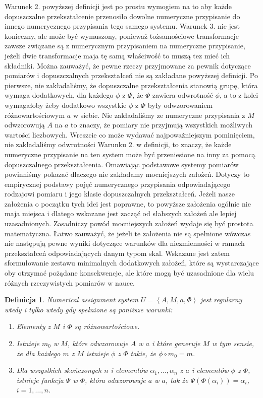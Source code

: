 \documentclass[12pt,a4paper]{report}
\newtheorem{definition}{Definicja}
\newcommand{\tuple}[1]{\left\langle {#1} \right\rangle}
\begin{document}
Warunek 2. powyższej definicji jest po prostu wymogiem na to aby każde dopuszczalne przekształcenie  przenosiło dowolne numeryczne przypisanie do innego numerycznego przypisania tego samego systemu. Warunek 3. nie jest konieczny, ale może być wymuszony, ponieważ tożsamościowe transformacje zawsze związane są z numerycznym przypisaniem na numeryczne przypisanie, jeżeli dwie transformacje maja tę samą właściwość to muszą tez mieć ich składniki. Można zauważyć, że pewne rzeczy przyjmowane za pewnik dotyczące pomiarów i dopuszczalnych przekształceń nie są zakładane  powyższej definicji. Po pierwsze, nie zakładaliśmy, że dopuszczalne przekształcenia stanowią grupę, która wymaga dodatkowych, dla każdego $\phi$ z $\Phi$, że $\Phi$ zawiera odwrotność $\phi$, a to z kolei wymagałoby żeby dodatkowo wszystkie $\phi$ z $\Phi$ były odwzorowaniem różnowartościowym $a$ w siebie. Nie zakładaliśmy ze numeryczne przypisania z $M$ odwzorowują $A$ na $a$ to znaczy, że pomiary nie przyjmują wszystkich  możliwych wartości liczbowych. Wreszcie co może wydawać najpoważniejszym pominięciem, nie zakładaliśmy odwrotności Warunku 2. w definicji, to znaczy, że każde numeryczne przypisanie na ten system może być przeniesione na inny za pomocą dopuszczalnego przekształcenia. Omawiając podstawowe systemy pomiarów powinniśmy pokazać dlaczego nie zakładamy mocniejszych założeń. Dotyczy to empirycznej podstawy pojęć numerycznego przypisania odpowiadającego rodzajowi pomiaru i jego klasie dopuszczalnych przekształceń. Jeżeli nasze założenia o początku tych idei jest poprawne, to powyższe założenia ogólnie nie maja miejsca i dlatego wskazane jest zacząć od słabszych założeń ale lepiej uzasadnionych. Zasadniczy powód mocniejszych założeń wydaje się być prostota matematyczna. Łatwo zauważyć, że jeżeli te założenia nie są spełnione 
wówczas nie następują pewne wyniki dotyczące warunków dla niezmienności w ramach przekształceń odpowiadających danym typom skal. Wskazane jest zatem sformułowanie zestawu minimalnych dodatkowych założeń, które są wystarczające oby otrzymać pożądane konsekwencje, ale które mogą być uzasadnione dla wielu różnych rzeczywistych pomiarów w nauce.
\begin{definition}
Numerical assignment system $U=\tuple{A, M, a, \Phi}$ jest regularny wtedy i tylko wtedy gdy spełnione są poniższe warunki:
\begin{enumerate}
\item
Elementy z $M$ i $\Phi$ są różnowartościowe.
\item
Istnieje $m_{0}$ w $M$, które odwzorowuje $A$ w $a$ i które generuje $M$ w tym sensie, że dla każdego $m$ z $M$ istnieje $\phi$ z $\Phi$ takie, że $\phi \circ m_{0}=m$.
\item
Dla wszystkich skończonych $n$ i elementów $\alpha_{1},\dots,\alpha_{n}$ z $a$ i elementów $\phi$ z $\Phi$, istnieje funkcja $\Psi$ w $\Phi$, która odwzorowuje $a$ w $a$, tak że $\Psi(\Phi(\alpha_{i}))=\alpha_{i}$, $i=1,\ldots,n$.
\end{enumerate}
\end{definition}
\end{document}
